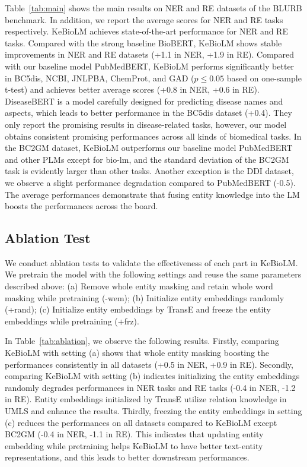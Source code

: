 \documentclass[11pt]{article}
\begin{document}
Table~\ref{tab:main} shows the main results on NER and RE datasets of the BLURB benchmark.
In addition, we report the average scores for NER and RE tasks respectively.
KeBioLM achieves state-of-the-art performance for NER and RE tasks.
Compared with the strong baseline BioBERT, KeBioLM shows stable improvements in NER and RE datasets (+1.1 in NER, +1.9 in RE).
Compared with our baseline model PubMedBERT, KeBioLM performs significantly better in BC5dis, NCBI, JNLPBA, ChemProt, and GAD ($p \leq 0.05$ based on one-sample t-test) and achieves better average scores (+0.8 in NER, +0.6 in RE).
DiseaseBERT is a model carefully designed for predicting disease names and aspects, which leads to better performance in the BC5dis dataset (+0.4). They only report the promising results in disease-related tasks, however, our model obtains consistent promising performances across all kinds of biomedical tasks.
In the BC2GM dataset, KeBioLM outperforms our baseline model PubMedBERT and other PLMs except for bio-lm, and the standard deviation of the BC2GM task is evidently larger than other tasks.
Another exception is the DDI dataset, we observe a slight performance degradation compared to PubMedBERT (-0.5).
The average performances demonstrate that fusing entity knowledge into the LM boosts the performances across the board.

\subsection{Ablation Test}
We conduct ablation tests to validate the effectiveness of each part in KeBioLM.
We pretrain the model with the following settings and reuse the same parameters described above:
(a) Remove whole entity masking and retain whole word masking while pretraining (-wem);
(b) Initialize entity embeddings randomly (+rand);
(c) Initialize entity embeddings by TransE and freeze the entity embeddings while pretraining (+frz).

In Table~\ref{tab:ablation}, we observe the following results.
Firstly, comparing KeBioLM with setting (a) shows that whole entity masking boosting the performances consistently in all datasets (+0.5 in NER, +0.9 in RE).
Secondly, comparing KeBioLM with setting (b) indicates initializing the entity embeddings randomly degrades performances in NER tasks and RE tasks (-0.4 in NER, -1.2 in RE).
Entity embeddings initialized by TransE utilize relation knowledge in UMLS and enhance the results. 
Thirdly, freezing the entity embeddings in setting (c) reduces the performances on all datasets compared to KeBioLM except BC2GM (-0.4 in NER, -1.1 in RE).
This indicates that updating entity embedding while pretraining helps KeBioLM to have better text-entity representations, and this leads to better downstream performances.
\end{document}
